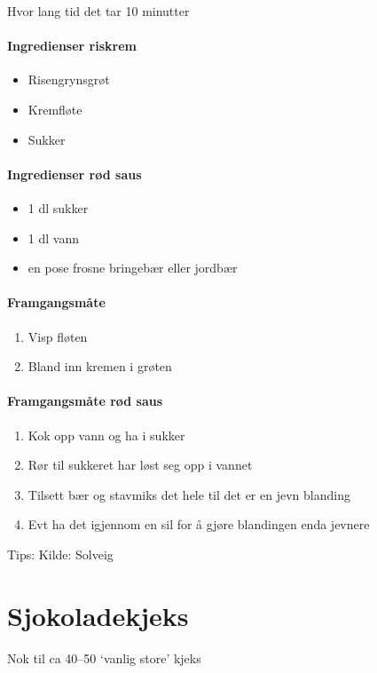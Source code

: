 \documentclass[12pt,a4paper]{book}
\begin{document}
{Hvor lang tid det tar 10 minutter

\paragraph{Ingredienser riskrem}
\begin{itemize}[noitemsep]
	\item Risengrynsgrøt
	\item Kremfløte
	\item Sukker
\end{itemize}

\paragraph{Ingredienser rød saus}
\begin{itemize}[noitemsep]
	\item 1 dl sukker
	\item 1 dl vann
	\item en pose frosne bringebær eller jordbær
\end{itemize}

\paragraph{Framgangsmåte}
\begin{enumerate}[noitemsep]
	\item Visp fløten
	\item Bland inn kremen i grøten
\end{enumerate}

\paragraph{Framgangsmåte rød saus}
\begin{enumerate}[noitemsep]
	\item Kok opp vann og ha i sukker
	\item Rør til sukkeret har løst seg opp i vannet
	\item Tilsett bær og stavmiks det hele til det er en jevn blanding
	\item Evt ha det igjennom en sil for å gjøre blandingen enda jevnere
\end{enumerate}




Tips:
Kilde: Solveig
\clearpage{}
\clearpage{}\section{﻿Sjokoladekjeks}
Nok til ca 40--50 `vanlig store' kjeks

}
\end{document}
